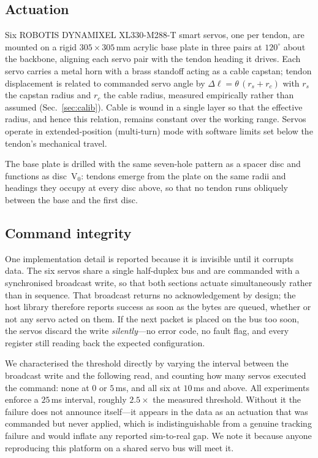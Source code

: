 \documentclass[letterpaper, 10pt, conference]{ieeeconf}
\begin{document}
\subsection{Actuation}

Six ROBOTIS DYNAMIXEL XL330-M288-T smart servos, one per tendon, are mounted
on a rigid $305\times305\,$mm acrylic base plate in three pairs at $120^\circ$
about the backbone, aligning each servo pair with the tendon heading it
drives. Each servo carries a metal horn with a brass standoff acting as a
cable capstan; tendon displacement is related to commanded servo angle by
$\Delta \ell = \theta\,(r_{s} + r_{c})$ with $r_{s}$ the capstan radius and
$r_{c}$ the cable radius, measured empirically rather than assumed
(Sec.~\ref{sec:calib}). Cable is wound in a single layer so that the
effective radius, and hence this relation, remains constant over the working
range. Servos operate in extended-position (multi-turn) mode with software
limits set below the tendon's mechanical travel.

The base plate is drilled with the same seven-hole pattern as a spacer disc
and functions as disc~V$_0$: tendons emerge from the plate on the same radii
and headings they occupy at every disc above, so that no tendon runs obliquely
between the base and the first disc.

\subsection{Command integrity}

One implementation detail is reported because it is invisible until it
corrupts data. The six servos share a single half-duplex bus and are
commanded with a synchronised broadcast write, so that both sections actuate
simultaneously rather than in sequence. That broadcast returns no
acknowledgement by design; the host library therefore reports success as soon
as the bytes are queued, whether or not any servo acted on them. If the next
packet is placed on the bus too soon, the servos discard the write
\emph{silently}---no error code, no fault flag, and every register still
reading back the expected configuration.

We characterised the threshold directly by varying the interval between the
broadcast write and the following read, and counting how many servos executed
the command: none at $0$ or $5\,$ms, and all six at $10\,$ms and above. All
experiments enforce a $25\,$ms interval, roughly $2.5\times$ the measured
threshold. Without it the failure does not announce itself---it appears in the
data as an actuation that was commanded but never applied, which is
indistinguishable from a genuine tracking failure and would inflate any
reported sim-to-real gap. We note it because anyone reproducing this platform
on a shared servo bus will meet it.
\end{document}
